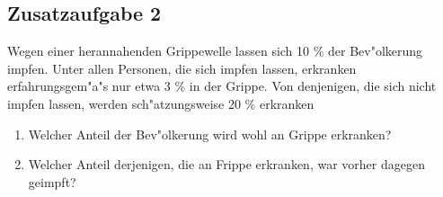 \subsection*{Zusatzaufgabe 2}

Wegen einer herannahenden Grippewelle lassen sich 10 \% der Bev"olkerung impfen. Unter allen Personen, die sich impfen lassen, erkranken erfahrungsgem"a"s nur etwa 3 \% in der Grippe. Von denjenigen, die sich nicht impfen lassen, werden sch"atzungsweise 20 \% erkranken

\begin{enumerate} [label=\alph*)]
\item Welcher Anteil der Bev"olkerung wird wohl an Grippe erkranken?
\item Welcher Anteil derjenigen, die an Frippe erkranken, war vorher dagegen geimpft?
\end{enumerate}